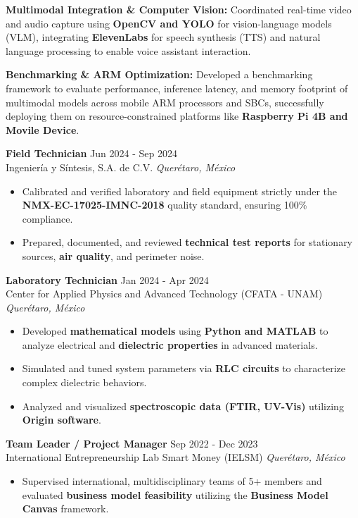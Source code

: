 \documentclass[10pt,a4paper]{article}
\newcommand{\workexp}[5]{
    \textbf{#1} \hfill #2\\
    \textcolor{primary}{#3} \hfill \textit{#4}\vspace{5pt}
    \begin{itemize}[leftmargin=*,nosep]
    #5
    \end{itemize}
    \vspace{5pt}
}
\begin{document}
{    \item \textbf{Multimodal Integration \& Computer Vision:} Coordinated real-time video and audio capture using \textbf{OpenCV and YOLO} for vision-language models (VLM), integrating \textbf{ElevenLabs} for speech synthesis (TTS) and natural language processing to enable voice assistant interaction.
    \item \textbf{Benchmarking \& ARM Optimization:} Developed a benchmarking framework to evaluate performance, inference latency, and memory footprint of multimodal models across mobile ARM processors and SBCs, successfully deploying them on resource-constrained platforms like \textbf{Raspberry Pi 4B and Movile Device}.


    
}
\vspace{6pt}
\workexp{Field Technician}{Jun 2024 - Sep 2024}{Ingeniería y Síntesis, S.A. de C.V.}{Querétaro, México}{
    \item Calibrated and verified laboratory and field equipment strictly under the \textbf{NMX-EC-17025-IMNC-2018} quality standard, ensuring 100\% compliance.
    \item Prepared, documented, and reviewed \textbf{technical test reports} for stationary sources, \textbf{air quality}, and perimeter noise.
}
\vspace{6pt}
\workexp{Laboratory Technician}{Jan 2024 - Apr 2024}{Center for Applied Physics and Advanced Technology (CFATA - UNAM)}{Querétaro, México}{
    \item Developed \textbf{mathematical models} using \textbf{Python and MATLAB} to analyze electrical and \textbf{dielectric properties} in advanced materials.
    \item Simulated and tuned system parameters via \textbf{RLC circuits} to characterize complex dielectric behaviors.
    \item Analyzed and visualized \textbf{spectroscopic data (FTIR, UV-Vis)} utilizing \textbf{Origin software}.
}
\vspace{6pt}
\workexp{Team Leader / Project Manager}{Sep 2022 - Dec 2023}{International Entrepreneurship Lab Smart Money (IELSM)}{Querétaro, México}{
    \item Supervised international, multidisciplinary teams of 5+ members and evaluated \textbf{business model feasibility} utilizing the \textbf{Business Model Canvas} framework.
}

\end{document}
